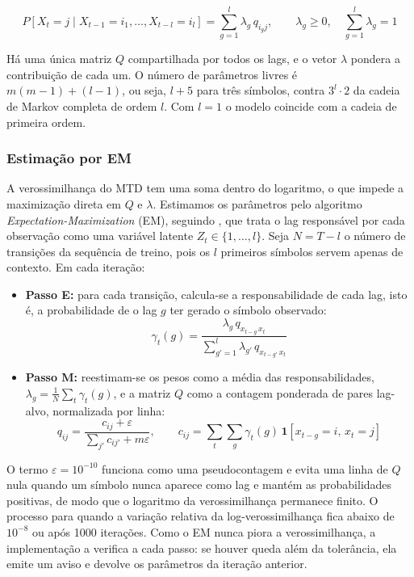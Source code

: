 \documentclass[
    12pt,                %
    openright,           %
    oneside,             %
    a4paper,             %
    english,             %
    brazil               %
]{abntex2}
\begin{document}
\begin{equation}
    P[X_t = j \mid X_{t-1} = i_1, \dots, X_{t-l} = i_l] = \sum_{g=1}^{l} \lambda_g \, q_{i_g j},
    \qquad \lambda_g \geq 0, \quad \sum_{g=1}^{l} \lambda_g = 1
\end{equation}

Há uma única matriz $Q$ compartilhada por todos os lags, e o vetor $\lambda$ pondera a contribuição de cada um. O número de parâmetros livres é
$m(m-1) + (l-1)$, ou seja, $l + 5$ para três símbolos, contra $3^l \cdot 2$ da cadeia de Markov completa de ordem $l$. Com $l = 1$ o modelo coincide com a
cadeia de primeira ordem.

\subsubsection{Estimação por EM}

A verossimilhança do MTD tem uma soma dentro do logaritmo, o que impede a maximização direta em $Q$ e $\lambda$. Estimamos os parâmetros pelo algoritmo
\textit{Expectation-Maximization} (EM), seguindo , que trata o lag responsável por cada observação como uma variável latente $Z_t \in \{1, \dots, l\}$.
Seja $N = T - l$ o número de transições da sequência de treino, pois os $l$ primeiros símbolos servem apenas de contexto. Em cada iteração:

\begin{itemize}
  \item \textbf{Passo E:} para cada transição, calcula-se a responsabilidade de cada lag, isto é, a probabilidade de o lag $g$ ter gerado o símbolo observado:
  \begin{equation}
      \gamma_t(g) = \frac{\lambda_g \, q_{x_{t-g}\, x_t}}{\sum_{g'=1}^{l} \lambda_{g'} \, q_{x_{t-g'}\, x_t}}
  \end{equation}
  \item \textbf{Passo M:} reestimam-se os pesos como a média das responsabilidades, $\lambda_g = \frac{1}{N}\sum_t \gamma_t(g)$, e a matriz $Q$ como a contagem
  ponderada de pares lag-alvo, normalizada por linha:
  \begin{equation}
      q_{ij} = \frac{c_{ij} + \varepsilon}{\sum_{j'} c_{ij'} + m\varepsilon}, \qquad
      c_{ij} = \sum_{t} \sum_{g} \gamma_t(g) \, \mathbf{1}[x_{t-g} = i,\, x_t = j]
  \end{equation}
\end{itemize}

O termo $\varepsilon = 10^{-10}$ funciona como uma pseudocontagem e evita uma linha de $Q$ nula quando um símbolo nunca aparece como lag e mantém as
probabilidades positivas, de modo que o logaritmo da verossimilhança permanece finito. O processo para quando a variação relativa da log-verossimilhança fica abaixo de
$10^{-8}$ ou após 1000 iterações. Como o EM nunca piora a verossimilhança, a implementação a verifica a cada passo: se houver queda além da tolerância, ela emite um
aviso e devolve os parâmetros da iteração anterior.
\end{document}

